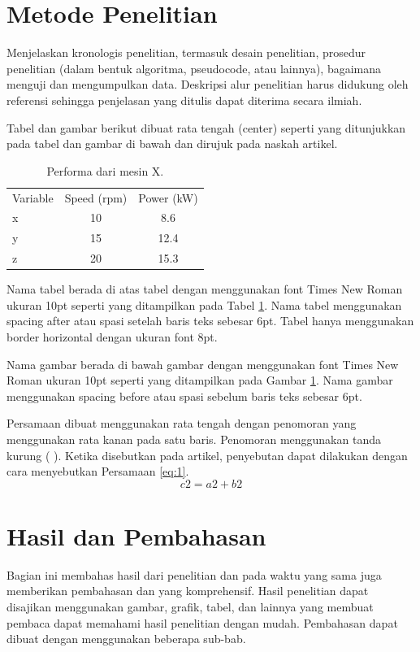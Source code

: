 \documentclass[10pt]{article}
\begin{document}
\section{Metode Penelitian}
Menjelaskan kronologis penelitian, termasuk desain penelitian, prosedur penelitian (dalam bentuk algoritma, pseudocode, atau lainnya), bagaimana menguji dan mengumpulkan data. Deskripsi alur penelitian harus didukung oleh referensi sehingga penjelasan yang ditulis dapat diterima secara ilmiah.

Tabel dan gambar berikut dibuat rata tengah (center) seperti yang ditunjukkan pada tabel dan gambar di bawah dan dirujuk pada naskah artikel.

\begin{table}[h]
\centering
\caption{Performa dari mesin X.}
\begin{tabular}{lcc}
Variable & Speed (rpm) & Power (kW) \\
x & 10 & 8.6 \\
y & 15 & 12.4 \\
z & 20 & 15.3 \\
\end{tabular}
\label{tab:1}
\end{table}

Nama tabel berada di atas tabel dengan menggunakan font Times New Roman ukuran 10pt seperti yang ditampilkan pada Tabel \ref{tab:1}. Nama tabel menggunakan spacing after atau spasi setelah baris teks sebesar 6pt. Tabel hanya menggunakan border horizontal dengan ukuran font 8pt.

\begin{figure}[h]
\centering
{}
\label{fig:1}
\end{figure}

Nama gambar berada di bawah gambar dengan menggunakan font Times New Roman ukuran 10pt seperti yang ditampilkan pada Gambar \ref{fig:1}. Nama gambar menggunakan spacing before atau spasi sebelum baris teks sebesar 6pt.

Persamaan dibuat menggunakan rata tengah dengan penomoran yang menggunakan rata kanan pada satu baris. Penomoran menggunakan tanda kurung ( ). Ketika disebutkan pada artikel, penyebutan dapat dilakukan dengan cara menyebutkan Persamaan \ref{eq:1}.
\begin{equation}
c2 = a2 + b2 \label{eq:1}
\end{equation}

\section{Hasil dan Pembahasan}
Bagian ini membahas hasil dari penelitian dan pada waktu yang sama juga memberikan pembahasan dan yang komprehensif. Hasil penelitian dapat disajikan menggunakan gambar, grafik, tabel, dan lainnya yang membuat pembaca dapat memahami hasil penelitian dengan mudah. Pembahasan dapat dibuat dengan menggunakan beberapa sub-bab.
\end{document}
